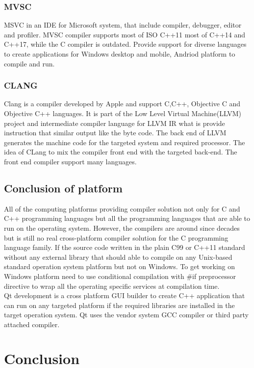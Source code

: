 \documentclass[12pt]{article}
\begin{document}
{\subsubsection{MVSC}
MSVC in an IDE for Microsoft system, that include compiler, debugger, editor and profiler. MVSC compiler supports most of ISO C++11 most of C++14 and C++17, while the C compiler is outdated. Provide support for diverse languages to create applications for Windows desktop and mobile, Andriod platform to compile and run.\cite{Heng}\\

\subsubsection{CLANG}
Clang is a compiler developed by Apple and support C,C++, Objective C and Objective C++ languages. It is part of the Low Level Virtual Machine(LLVM) project and intermediate compiler language for LLVM IR what is provide instruction that similar output like the byte code. The back end of LLVM generates the machine code for the targeted system and required processor. The idea of CLang to mix the compiler front end with the targeted back-end. The front end compiler support many languages.\cite{Bolton_d}

\subsection{Conclusion of platform}
All of the computing platforms providing compiler solution not only for C and C++ programming languages but all the programming languages that are able to run on the operating system. However, the compilers are around since decades but is still no real cross-platform compiler solution for the C programming language family. If the source code written in the plain C99 or C++11 standard without any external library that should able to compile on any Unix-based standard operation system platform but not on Windows. To get working on Windows platform need to use conditional compilation with \#if preprocessor directive to wrap all the operating specific services at compilation time.\\ 

Qt development is a cross platform GUI builder to create C++ application that can run on any targeted platform if the required libraries are installed in the target operation system. Qt uses the vendor system GCC compiler or third party attached compiler.

\clearpage
\section{Conclusion}

}
\end{document}
